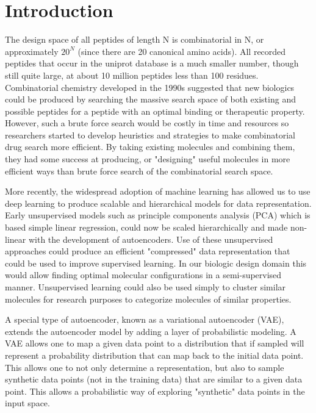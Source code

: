 \documentclass[final,1p,times,twocolumn]{elsarticle}
\begin{document}
\linenumbers

\section{Introduction}

The design space of all peptides of length N is combinatorial in N, or approximately $20^N$ (since there are 20 canonical amino acids). All recorded peptides that occur in the uniprot database is a much smaller number, though still quite large, at about 10 million peptides less than 100 residues. Combinatorial chemistry developed in the 1990s suggested that new biologics could be produced by searching the massive search space of both existing and possible peptides for a peptide with an optimal binding or therapeutic property. However, such a brute force search would be costly in time and resources so researchers started to develop heuristics and strategies to make combinatorial drug search more efficient\cite{feher2003property}. By taking existing molecules and combining them, they had some success at producing, or "designing" useful molecules in more efficient ways than brute force search of the combinatorial search space.

More recently, the widespread adoption of machine learning has allowed us to use deep learning to produce scalable and hierarchical models for data representation. Early unsupervised models such as principle components analysis (PCA) which is based simple linear regression, could now be scaled hierarchically and made non-linear with the development of autoencoders\cite{hinton1994autoencoders}. Use of these unsupervised approaches could produce an efficient "compressed" data representation that could be used to improve supervised learning. In our biologic design domain this would allow finding optimal molecular configurations in a semi-supervised manner. Unsupervised learning could also be used simply to cluster similar molecules for research purposes to categorize molecules of similar properties.

A special type of autoencoder, known as a variational autoencoder (VAE), extends the autoencoder model by adding a layer of probabilistic modeling\cite{kingma2013auto}. A VAE allows one to map a given data point to a distribution that if sampled will represent a probability distribution that can map back to the initial data point. This allows one to not only determine a representation, but also to sample synthetic data points (not in the training data) that are similar to a given data point. This allows a probabilistic way of exploring "synthetic" data points in the input space.
\end{document}
